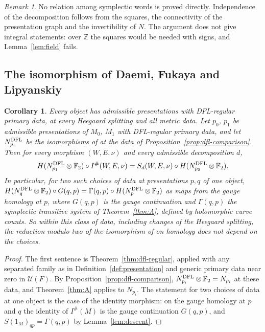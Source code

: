\documentclass[11pt]{amsart}
\newtheorem{corollary}[theorem]{Corollary}
\theoremstyle{definition}
\theoremstyle{remark}
\newtheorem{remark}[theorem]{Remark}
\theoremstyle{plain}
\numberwithin{equation}{section}
\newcommand{\ZZ}{\mathbb{Z}}
\newcommand{\FF}{\mathbb{F}_2}
\newcommand{\Ish}{I^{\#}}
\begin{document}
\begin{remark}
No relation among symplectic words is proved directly. Independence of
the decomposition follows from the squares, the connectivity of the
presentation graph and the invertibility of $N$. The argument does not
give integral statements: over $\ZZ$ the squares would be needed with
signs, and Lemma~\ref{lem:field} fails.
\end{remark}

\subsection{The isomorphism of Daemi, Fukaya and Lipyanskiy}

\begin{corollary}\label{cor:dfl-natural}
Every object has admissible presentations with DFL-regular primary data, at every Heegaard
splitting and all metric data. Let $p_0$, $p_1$ be admissible presentations of $M_0$, $M_1$ with DFL-regular primary
data, and let $N^{\rm DFL}_{p_i}$ be the isomorphisms of \cite[Theorem~3.29]{DFL} at the
data of Proposition~\ref{prop:dfl-comparison}. Then for every morphism $(W,E,\nu)$ and
every admissible decomposition $d$,
\[
H(N^{\rm DFL}_{p_1}\otimes\FF)\circ\Ish(W,E,\nu)=S_d(W,E,\nu)\circ H(N^{\rm DFL}_{p_0}\otimes\FF).
\]
In particular, for two such choices of data at presentations $p,q$ of one object,
$H(N^{\rm DFL}_q\otimes\FF)\circ G(q,p)=\Gamma(q,p)\circ H(N^{\rm DFL}_p\otimes\FF)$ as maps from
the gauge homology at $p$, where $G(q,p)$ is the gauge continuation and $\Gamma(q,p)$ the
symplectic transitive system of Theorem~\ref{thm:A}, defined by holomorphic curve counts.
So within this class of data, including changes of the Heegaard splitting, the reduction
modulo two of the isomorphism of \cite{DFL} on homology does not depend on the choices.
\end{corollary}

\begin{proof}
The first sentence is Theorem~\ref{thm:dfl-regular}, applied with any separated family as in
Definition~\ref{def:presentation} and generic primary data near zero in $\mathcal U(F)$.
By Proposition~\ref{prop:dfl-comparison}, $N^{\rm DFL}_{p_i}\otimes\FF=N_{p_i}$ at these data,
and Theorem~\ref{thm:A} applies to $N_{p_i}$. The statement for two choices of data at one
object is the case of the identity morphism: on the gauge homology at $p$ and $q$ the identity of $\Ish(M)$ is the
gauge continuation $G(q,p)$, and $S(1_M)_{qp}=\Gamma(q,p)$ by Lemma~\ref{lem:descent}.
\end{proof}
\end{document}
